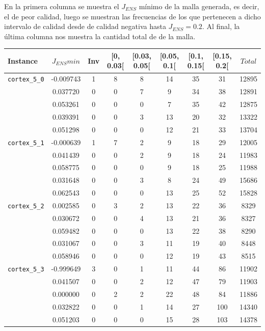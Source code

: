 En la primera columna se muestra el $J_{ENS}$ mínimo de la malla generada, es decir, el \element{} de peor calidad, luego se muestran las frecuencias de los \elements{} que pertenecen a dicho intervalo de calidad desde \elements{} de calidad negativa hasta $J_{ENS} = 0.2$. Al final, la última columna nos muestra la cantidad total de \elements{} de la malla.


\begin{table}[H]
	\scriptsize 
	\centering
	\begin{tabular}{lc cc cc cc c}
		\hline
		Instance & $J_{ENS}min$ & Inv & [0, 0.03[ & [0.03, 0.05[ & [0.05, 0.1[ & [0.1, 0.15[ & [0.15, 0.2[ & $Total$ \\
		\hline
		\texttt{cortex\_5\_0} & -0.009743 & 1 & 8 & 8 & 14 & 35 & 31 & 12895 \\
		& 0.037720 & 0 & 0 & 7 & 9 & 34 & 38 & 12891 \\
		& 0.053261 & 0 & 0 & 0 & 7 & 35 & 42 & 12875 \\
		& 0.039391 & 0 & 0 & 3 & 13 & 20 & 32 & 13322 \\
	 	& 0.051298 & 0 & 0 & 0 & 12 & 21 & 33 & 13704 \\
		\hline
		\texttt{cortex\_5\_1} & -0.000639 & 1 & 7 & 2 & 9 & 18 & 29 & 12005 \\
		& 0.041439 & 0 & 0 & 2 & 9 & 18 & 24 & 11983 \\
		& 0.058775 & 0 & 0 & 0 & 9 & 18 & 25  & 11988 \\
		& 0.031648 & 0 & 0 & 3 & 8 & 24 & 49 & 15686 \\
		& 0.062543 & 0 & 0 & 0 & 13 & 25 & 52 & 15828 \\
		\hline
		\texttt{cortex\_5\_2} & 0.002585 & 0 & 3 & 2 & 13 & 22 & 36 & 8329 \\
		& 0.030672 & 0 & 0 & 4 & 13 & 21 & 36 & 8327 \\
		& 0.059482 & 0 & 0 & 0 & 13 & 22 & 38 & 8290 \\
		& 0.031067 & 0 & 0 & 3 & 11 & 19 & 40 & 8448 \\
		& 0.058946 & 0 & 0 & 0 & 12 & 19 & 43 & 8515 \\
		\hline
		\texttt{cortex\_5\_3} & -0.999649 & 3 & 0 & 1 & 11 & 44 & 86 & 11902 \\
		& 0.041507 & 0 & 0 & 2 & 12 & 47 & 79 & 11903 \\
		& 0.000000 & 0 & 2 & 2 & 22 & 48 & 84 & 11886 \\
		& 0.032822 & 0 & 0 & 1 & 14 & 27 & 100 & 14340 \\
		& 0.051203 & 0 & 0 & 0 & 15 & 28 & 103 & 14378 \\

\end{tabular}
\end{table}
